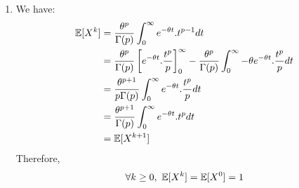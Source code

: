 \begin{solution}
  \begin{enumerate}
    \item We have:
          \begin{align*}
            \mathbb{E}[X^k] & = \frac{\theta^{p}}{\Gamma(p)} \int_0^\infty e^{-\theta t} . t^{p-1} dt                                                                                                     \\
                            & = \frac{\theta^{p}}{\Gamma(p)} \left[ e^{-\theta t} . \frac{t^p}{p} \right]_0^\infty - \frac{\theta^{p}}{\Gamma(p)} \int_0^\infty  -\theta e^{-\theta t} . \frac{t^p}{p} dt \\
                            & = \frac{\theta^{p+1}}{p \Gamma(p)} \int_0^\infty e^{-\theta t} . \frac{t^p}{p} dt                                                                                           \\
                            & = \frac{\theta^{p+1}}{\Gamma(p)} \int_0^\infty e^{-\theta t} . t^p dt                                                                                                       \\
                            & = \mathbb{E}[X^{k+1}]
          \end{align*}
          Therefore,
          \[
            \forall k \geq 0, ~ \mathbb{E}[X^k] = \mathbb{E}[X^0] = 1
          \]
  \end{enumerate}
\end{solution}